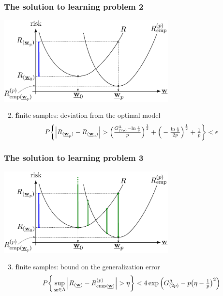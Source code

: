 \begin{frame}\frametitle{The solution to learning problem 2} 
	\begin{center}
		\includegraphics[width=9cm]{img/section2_fig1_question1}
	\end{center}
	\begin{enumerate}\setcounter{enumi}{1}
		\item {\textbf finite samples:} deviation from the optimal model
			\vspace{-2mm}
			$$
				P\bigg\{ {%
				\Big| R_{(\vec w_p)} - R_{(\vec w_0)} \Big| }
					> \Big(\smallfrac{G^\Lambda_{(2p)} 
						- \ln \frac{\epsilon}{8}}{p} \Big)^\frac{1}{2}
					+ \Big(-\smallfrac{\ln \frac{\epsilon}{2}}{2p} 
						\Big)^\frac{1}{2} + \smallfrac{1}{p}
				\bigg\} < \epsilon
			$$
			\vspace{-4mm}
	\end{enumerate}
\end{frame}

\begin{frame}\frametitle{The solution to learning problem 3} 
	\begin{center}
		\includegraphics[width=9cm]{img/section2_fig1_question2_lessw}
	\end{center}
	\begin{enumerate}\setcounter{enumi}{2}
		\item {\textbf finite samples:} bound on the generalization error
			\vspace{-2mm}
			$$
				P\bigg\{ \sup\limits_{\vec w \in \Lambda}
					{%
						\Big|R_{(\vec w)} - R^{(p)}_{\text{emp}(\vec w)}\Big| 
					} > \eta
				\bigg\} < 4 \exp\Big( G^\Lambda_{(2p)} 
					- p \big( \eta - \smallfrac{1}{p} \big)^2 \Big)
			$$
			\vspace{-4mm}
	\end{enumerate}
\end{frame}
